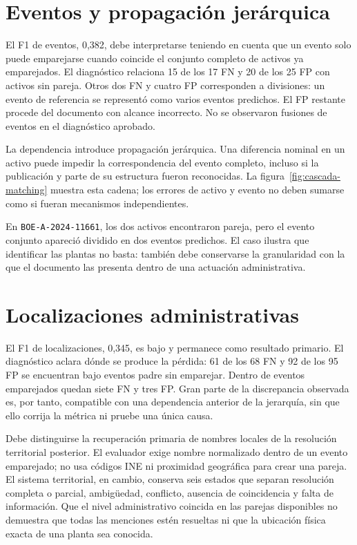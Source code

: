 \section{Eventos y propagación jerárquica}
El F1 de eventos, 0,382, debe interpretarse teniendo en cuenta que un evento
solo puede emparejarse cuando coincide el conjunto completo de activos ya
emparejados. El diagnóstico relaciona 15 de los 17 FN y 20 de los 25 FP con
activos sin pareja. Otros dos FN y cuatro FP corresponden a divisiones: un
evento de referencia se representó como varios eventos predichos. El FP
restante procede del documento con alcance incorrecto. No se observaron
fusiones de eventos en el diagnóstico aprobado.

La dependencia introduce propagación jerárquica. Una diferencia nominal en
un activo puede impedir la correspondencia del evento completo, incluso si
la publicación y parte de su estructura fueron reconocidas. La
figura~\ref{fig:cascada-matching} muestra esta cadena; los errores de activo y
evento no deben sumarse como si fueran mecanismos independientes.

En \texttt{BOE-A-2024-11661}, los dos activos encontraron pareja, pero el
evento conjunto apareció dividido en dos eventos predichos. El caso ilustra
que identificar las plantas no basta: también debe conservarse la granularidad
con la que el documento las presenta dentro de una actuación administrativa.

\section{Localizaciones administrativas}
El F1 de localizaciones, 0,345, es bajo y permanece como resultado primario.
El diagnóstico aclara dónde se produce la pérdida: 61 de los 68 FN y 92 de
los 95 FP se encuentran bajo eventos padre sin emparejar. Dentro de eventos
emparejados quedan siete FN y tres FP. Gran parte de la discrepancia observada
es, por tanto, compatible con una dependencia anterior de la jerarquía, sin
que ello corrija la métrica ni pruebe una única causa.

Debe distinguirse la recuperación primaria de nombres locales de la resolución
territorial posterior. El evaluador exige nombre normalizado dentro de un
evento emparejado; no usa códigos INE ni proximidad geográfica para crear una
pareja. El sistema territorial, en cambio, conserva seis estados que separan
resolución completa o parcial, ambigüedad, conflicto, ausencia de coincidencia
y falta de información. Que el nivel administrativo coincida en las parejas
disponibles no demuestra que todas las menciones estén resueltas ni que la
ubicación física exacta de una planta sea conocida.

